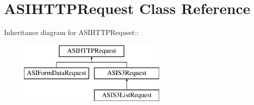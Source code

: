 \hypertarget{interface_a_s_i_h_t_t_p_request}{
\section{ASIHTTPRequest Class Reference}
\label{interface_a_s_i_h_t_t_p_request}
}
Inheritance diagram for ASIHTTPRequest::\begin{figure}[H]
\begin{center}
\leavevmode
\includegraphics[height=3cm]{interface_a_s_i_h_t_t_p_request}
\end{center}
\end{figure}
